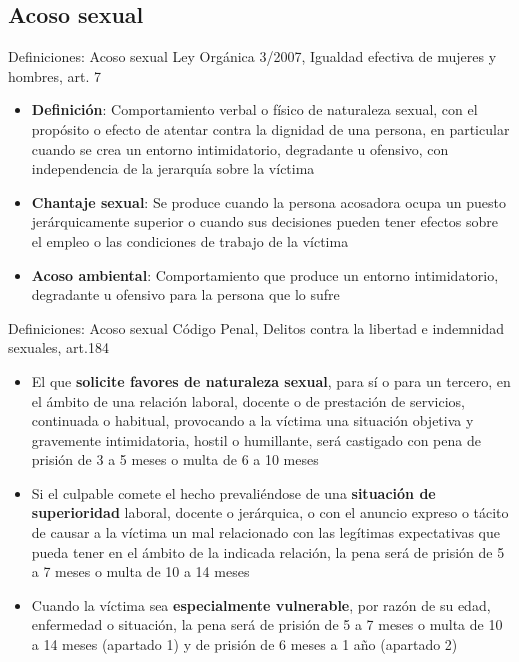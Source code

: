 \documentclass{beamer}
\begin{document}
    \subsection{Acoso sexual}
    \begin{frame}{Definiciones: Acoso sexual}
        Ley Orgánica 3/2007, Igualdad efectiva de mujeres y hombres, art. 7
        \begin{itemize}
            \item \textbf{Definición}: Comportamiento verbal o físico de naturaleza sexual, con el propósito o
            efecto de atentar contra la dignidad de una persona, en particular cuando se crea un entorno
            intimidatorio, degradante u ofensivo, con independencia de la jerarquía sobre la víctima
            \item \textbf{Chantaje sexual}: Se produce cuando la persona acosadora ocupa un puesto jerárquicamente
            superior o cuando sus decisiones pueden tener efectos sobre el empleo o las condiciones de trabajo de la
            víctima
            \item \textbf{Acoso ambiental}: Comportamiento que produce un entorno intimidatorio, degradante u ofensivo
            para la persona que lo sufre
        \end{itemize}
    \end{frame}

    \begin{frame}{Definiciones: Acoso sexual}
        Código Penal, Delitos contra la libertad e indemnidad sexuales, art.184
        \small
        \begin{itemize}
            \item El que \textbf{solicite favores de naturaleza sexual}, para sí o para un tercero, en el ámbito de una relación
            laboral, docente o de prestación de servicios, continuada o habitual, provocando a la
            víctima una situación objetiva y gravemente intimidatoria, hostil o humillante, será castigado con pena de
            prisión de 3 a 5 meses o multa de 6 a 10 meses
            \item Si el culpable comete el hecho prevaliéndose de una \textbf{situación de superioridad}
            laboral, docente o jerárquica, o con el anuncio expreso o tácito de causar a la víctima un mal relacionado con
            las legítimas expectativas que pueda tener en el ámbito de la indicada relación, la pena será de prisión
            de 5 a 7 meses o multa de 10 a 14 meses
            \item Cuando la víctima sea \textbf{especialmente vulnerable}, por razón de su edad, enfermedad o situación, la pena
            será de prisión de 5 a 7 meses o multa de 10 a 14 meses (apartado 1) y
            de prisión de 6 meses a 1 año (apartado 2)
        \end{itemize}
    \end{frame}
\end{document}
